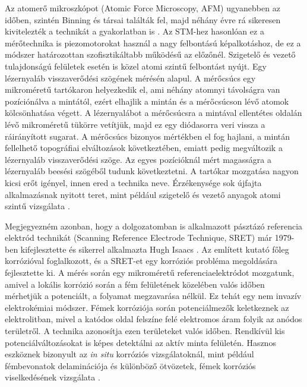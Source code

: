 Az atomerő mikroszkópot (Atomic Force Microscopy, AFM) ugyanebben az időben, szintén Binning és társai találták fel, majd néhány évre rá sikeresen kivitelezték a technikát a gyakorlatban is \cite{binnig1986atomic}. Az STM-hez hasonlóan ez a mérőtechnika is piezomotorokat használ a nagy felbontású képalkotáshoz, de ez a módszer határozottan szofisztikáltabb működésű az előzőnél. Szigetelő és vezető tulajdonságú felületek esetén is közel atomi szintű felbontást nyújt. Egy lézernyaláb visszaverődési szögének mérésén alapul. A mérőcsúcs egy mikroméretű tartókaron helyezkedik el, ami néhány atomnyi távolságra van pozíciónálva a mintától, ezért elhajlik a mintán és a mérőcsúcson lévő atomok kölcsönhatása végett. A lézernyalábot a mérőcsúcsra a mintával ellentétes oldalán lévő mikroméretű tükörre vetítjük, majd ez egy diódasorra veri vissza a ráirányított sugarat. A mérőcsúcs bizonyos mértékben el fog hajlani, a mintán fellelhető topográfiai elváltozások következtében, emiatt pedig megváltozik a lézernyaláb visszaverődési szöge. Az egyes pozícióknál mért magasságra a lézernyaláb beesési szögéből tudunk következtetni. A tartókar mozgatása nagyon kicsi erőt igényel, innen ered a technika neve. Érzékenysége sok újfajta alkalmazásnak nyitott teret, mint például szigetelő és vezető anyagok atomi szintű vizsgálata \cite{albrecht1988atomic}.

Megjegyezném azonban, hogy a dolgozatomban is alkalmazott pásztázó referencia elektród technikát (Scanning Reference Electrode Technique, SRET) már 1979-ben kifejlesztette és sikerrel alkalmazta Hugh Isaacs \cite{isaacs1981scanning}. Az említett kutató főleg korrózióval foglalkozott, és a SRET-et egy korróziós probléma megoldására fejlesztette ki. A mérés során egy mikroméretű referenciaelektródot mozgatunk, amivel a lokális korrózió során a fém felületének közelében valós időben mérhetjük a potenciált, a folyamat megzavarása nélkül. Ez tehát egy nem invazív elektrokémiai módszer. Fémek korróziója során potenciálmezők keletkeznek az elektrolitban, mivel a katódos oldal felszíne felé elektromos áram folyik az anódos területről. A technika azonosítja ezen területeket valós időben. Rendkívül kis potenciálváltozásokat is képes detektálni az aktív minta felületén. Hasznos eszköznek bizonyult az \emph{in situ} korróziós vizsgálatoknál, mint például fémbevonatok delaminációja és különböző ötvözetek, fémek korróziós viselkedésének vizsgálata \cite{maile2000evaluation, cui2001use}.

